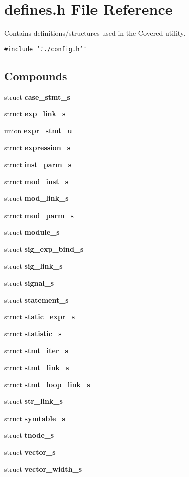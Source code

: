 \section{defines.h File Reference}
\label{defines_8h}
Contains definitions/structures used in the Covered utility.  


{\tt \#include \char`\"{}../config.h\char`\"{}}\par
\subsection*{Compounds}
\begin{CompactItemize}
\item 
struct {\bf case\_\-stmt\_\-s}
\item 
struct {\bf exp\_\-link\_\-s}
\item 
union {\bf expr\_\-stmt\_\-u}
\item 
struct {\bf expression\_\-s}
\item 
struct {\bf inst\_\-parm\_\-s}
\item 
struct {\bf mod\_\-inst\_\-s}
\item 
struct {\bf mod\_\-link\_\-s}
\item 
struct {\bf mod\_\-parm\_\-s}
\item 
struct {\bf module\_\-s}
\item 
struct {\bf sig\_\-exp\_\-bind\_\-s}
\item 
struct {\bf sig\_\-link\_\-s}
\item 
struct {\bf signal\_\-s}
\item 
struct {\bf statement\_\-s}
\item 
struct {\bf static\_\-expr\_\-s}
\item 
struct {\bf statistic\_\-s}
\item 
struct {\bf stmt\_\-iter\_\-s}
\item 
struct {\bf stmt\_\-link\_\-s}
\item 
struct {\bf stmt\_\-loop\_\-link\_\-s}
\item 
struct {\bf str\_\-link\_\-s}
\item 
struct {\bf symtable\_\-s}
\item 
struct {\bf tnode\_\-s}
\item 
struct {\bf vector\_\-s}
\item 
struct {\bf vector\_\-width\_\-s}
\end{CompactItemize}
